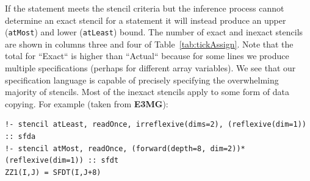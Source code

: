 \documentclass[9pt,preprint]{sigplanconf}
\theoremstyle{definition}
\newcommand{\term}[1]{\texttt{#1}}
\begin{document}







If the statement meets the stencil criteria but the inference process
cannot determine an exact stencil for a statement it will instead
produce an upper (\term{atMost}) and lower (\term{atLeast}) bound. The
number of exact and inexact stencils are shown in columns three and
four of Table~\ref{tab:tickAssign}. Note that the total for ``Exact``
is higher than ``Actual`` because for some lines we produce multiple
specifications (perhaps for different array variables).
We see that our specification language is capable of precisely specifying the overwhelming majority of stencils. Most of the inexact stencils apply to some form of data copying. For example (taken from \textbf{E3MG}):
\begin{verbatim}
!- stencil atLeast, readOnce, irreflexive(dims=2), (reflexive(dim=1)) :: sfda
!- stencil atMost, readOnce, (forward(depth=8, dim=2))*(reflexive(dim=1)) :: sfdt
ZZ1(I,J) = SFDT(I,J+8)
\end{verbatim}
\end{document}
